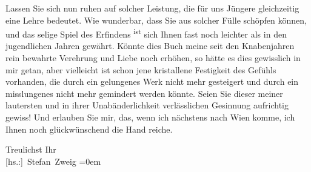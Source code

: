 \pstart
           Lassen Sie sich nun ruhen auf solcher Leistung, die für uns Jüngere gleichzeitig eine
               Lehre bedeutet. Wie wunderbar, dass Sie aus solcher Fülle schöpfen können, und das
               selige Spiel des Erfindens \substVorne{}\textsuperscript{ist }\substDazwischen{}sich\substHinten{} Ihnen fast noch leichter als in den jugendlichen Jahren gewährt. Könnte dies
                  Buch meine seit den
               Knabenjahren rein bewahrte Verehrung und Liebe noch erhöhen, so hätte es dies
               gewisslich in mir getan, aber vielleicht ist schon jene kristallene Festigkeit des
               Gefühls vorhanden, die durch ein gelungenes Werk nicht mehr gesteigert und durch ein
               misslungenes nicht mehr gemindert werden könnte. Seien Sie dieser meiner lautersten
               und in ihrer Unabänderlichkeit verlässlichen Gesinnung aufrichtig gewiss! Und
               erlauben Sie mir, das, wenn ich nächstens nach Wien komme, ich Ihnen noch glückwünschend die Hand reiche.\pend
           
\pstart
           Treulichst Ihr{\\[\baselineskip]}\spacefill\mbox{{[}hs.:{]} Stefan Zweig}\pend
           \leftskip=0em{}\endnumbering{}
\begin{anhang}
\end{anhang}
      